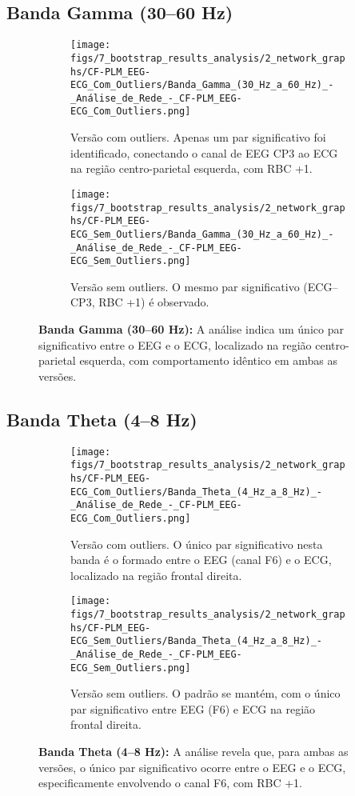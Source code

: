 \subsection{Banda Gamma (30–60 Hz)}
\begin{figure}[H]
    \centering
    \begin{subfigure}[b]{0.48\textwidth}
        \texttt{[image: figs/7\_bootstrap\_results\_analysis/2\_network\_graphs/CF-PLM\_EEG-ECG\_Com\_Outliers/Banda\_Gamma\_(30\_Hz\_a\_60\_Hz)\_-\_Análise\_de\_Rede\_-\_CF-PLM\_EEG-ECG\_Com\_Outliers.png]}
        \caption{\small Versão com outliers. Apenas um par significativo foi identificado, conectando o canal de EEG CP3 ao ECG na região centro-parietal esquerda, com RBC +1.}
    \end{subfigure}
    \hfill
    \begin{subfigure}[b]{0.48\textwidth}
        \texttt{[image: figs/7\_bootstrap\_results\_analysis/2\_network\_graphs/CF-PLM\_EEG-ECG\_Sem\_Outliers/Banda\_Gamma\_(30\_Hz\_a\_60\_Hz)\_-\_Análise\_de\_Rede\_-\_CF-PLM\_EEG-ECG\_Sem\_Outliers.png]}
        \caption{\small Versão sem outliers. O mesmo par significativo (ECG–CP3, RBC +1) é observado.}
    \end{subfigure}
    \caption[Análise de Rede – Banda Gamma (CF‐PLM EEG–ECG)]{\small \textbf{Banda Gamma (30–60 Hz):} A análise indica um único par significativo entre o EEG e o ECG, localizado na região centro-parietal esquerda, com comportamento idêntico em ambas as versões.}
    \label{fig:rede_gamma_cfplm}
\end{figure}

\subsection{Banda Theta (4–8 Hz)}
\begin{figure}[H]
    \centering
    \begin{subfigure}[b]{0.48\textwidth}
        \texttt{[image: figs/7\_bootstrap\_results\_analysis/2\_network\_graphs/CF-PLM\_EEG-ECG\_Com\_Outliers/Banda\_Theta\_(4\_Hz\_a\_8\_Hz)\_-\_Análise\_de\_Rede\_-\_CF-PLM\_EEG-ECG\_Com\_Outliers.png]}
        \caption{\small Versão com outliers. O único par significativo nesta banda é o formado entre o EEG (canal F6) e o ECG, localizado na região frontal direita.}
    \end{subfigure}
    \hfill
    \begin{subfigure}[b]{0.48\textwidth}
        \texttt{[image: figs/7\_bootstrap\_results\_analysis/2\_network\_graphs/CF-PLM\_EEG-ECG\_Sem\_Outliers/Banda\_Theta\_(4\_Hz\_a\_8\_Hz)\_-\_Análise\_de\_Rede\_-\_CF-PLM\_EEG-ECG\_Sem\_Outliers.png]}
        \caption{\small Versão sem outliers. O padrão se mantém, com o único par significativo entre EEG (F6) e ECG na região frontal direita.}
    \end{subfigure}
    \caption[Análise de Rede – Banda Theta (CF‐PLM EEG–ECG)]{\small \textbf{Banda Theta (4–8 Hz):} A análise revela que, para ambas as versões, o único par significativo ocorre entre o EEG e o ECG, especificamente envolvendo o canal F6, com RBC +1.}
    \label{fig:rede_theta_cfplm}
\end{figure}


